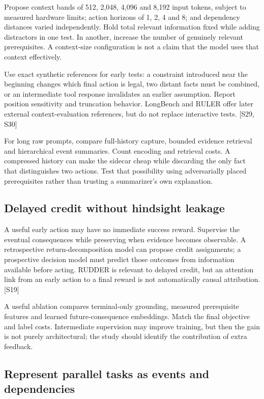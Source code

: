 \documentclass[
  11pt,
  a4paper,
]{article}
\begin{document}
Propose context bands of 512, 2,048, 4,096 and 8,192 input tokens,
subject to measured hardware limits; action horizons of 1, 2, 4 and 8;
and dependency distances varied independently. Hold total relevant
information fixed while adding distractors in one test. In another,
increase the number of genuinely relevant prerequisites. A context-size
configuration is not a claim that the model uses that context
effectively.

Use exact synthetic references for early tests: a constraint introduced
near the beginning changes which final action is legal, two distant
facts must be combined, or an intermediate tool response invalidates an
earlier assumption. Report position sensitivity and truncation behavior.
LongBench and RULER offer later external context-evaluation references,
but do not replace interactive tests. {[}S29, S30{]}

For long raw prompts, compare full-history capture, bounded evidence
retrieval and hierarchical event summaries. Count encoding and retrieval
costs. A compressed history can make the sidecar cheap while discarding
the only fact that distinguishes two actions. Test that possibility
using adversarially placed prerequisites rather than trusting a
summarizer's own explanation.

\subsection{Delayed credit without hindsight
leakage}\label{delayed-credit-without-hindsight-leakage}

A useful early action may have no immediate success reward. Supervise
the eventual consequences while preserving when evidence becomes
observable. A retrospective return-decomposition model can propose
credit assignments; a prospective decision model must predict those
outcomes from information available before acting. RUDDER is relevant to
delayed credit, but an attention link from an early action to a final
reward is not automatically causal attribution. {[}S19{]}

A useful ablation compares terminal-only grounding, measured
prerequisite features and learned future-consequence embeddings. Match
the final objective and label costs. Intermediate supervision may
improve training, but then the gain is not purely architectural; the
study should identify the contribution of extra feedback.

\subsection{Represent parallel tasks as events and
dependencies}\label{represent-parallel-tasks-as-events-and-dependencies}
\end{document}
